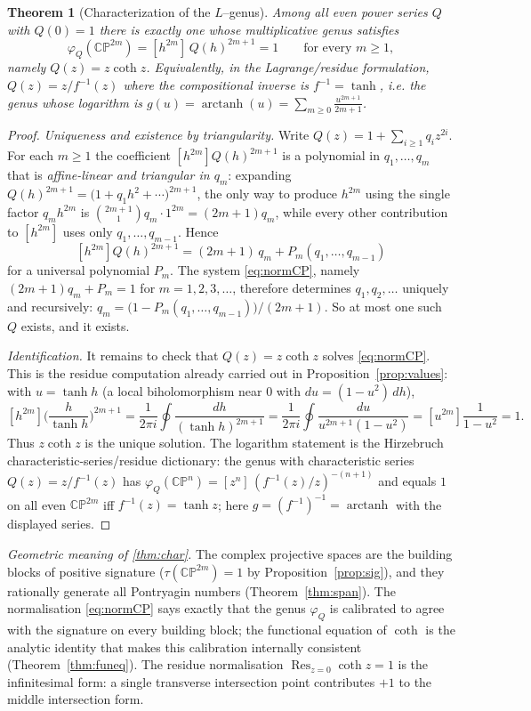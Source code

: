 \documentclass[12pt]{article}
\newtheorem{theorem}{Theorem}
\theoremstyle{definition}
\begin{document}
\begin{theorem}[Characterization of the $L$--genus]\label{thm:char}
Among all even power series $Q$ with $Q(0)=1$ there is exactly one whose multiplicative
genus satisfies
\[
\varphi_Q(\mathbb{CP}^{2m})=[h^{2m}]\,Q(h)^{2m+1}=1
\qquad\text{for every }m\ge1,
\tag{12}\label{eq:normCP}
\]
namely $Q(z)=z\coth z$. Equivalently, in the Lagrange/residue formulation, $Q(z)=z/f^{-1}(z)$
where the compositional inverse is $f^{-1}=\tanh$, i.e. the genus whose logarithm is
$g(u)=\operatorname{arctanh}(u)=\sum_{m\ge0}\frac{u^{2m+1}}{2m+1}$.
\end{theorem}

\begin{proof}
\emph{Uniqueness and existence by triangularity.} Write $Q(z)=1+\sum_{i\ge1}q_iz^{2i}$.
For each $m\ge1$ the coefficient $[h^{2m}]Q(h)^{2m+1}$ is a polynomial in $q_1,\dots,q_m$
that is \emph{affine-linear and triangular in $q_m$}: expanding
$Q(h)^{2m+1}=\big(1+q_1h^2+\cdots\big)^{2m+1}$, the only way to produce $h^{2m}$ using the
single factor $q_mh^{2m}$ is $\binom{2m+1}{1}q_m\cdot 1^{2m}=(2m+1)q_m$, while every other
contribution to $[h^{2m}]$ uses only $q_1,\dots,q_{m-1}$. Hence
\[
[h^{2m}]Q(h)^{2m+1}=(2m+1)\,q_m+P_m(q_1,\dots,q_{m-1})
\]
for a universal polynomial $P_m$. The system \eqref{eq:normCP}, namely
$(2m+1)q_m+P_m=1$ for $m=1,2,3,\dots$, therefore determines $q_1,q_2,\dots$ uniquely and
recursively: $q_m=\big(1-P_m(q_1,\dots,q_{m-1})\big)/(2m+1)$. So at most one such $Q$
exists, and it exists.

\emph{Identification.} It remains to check that $Q(z)=z\coth z$ solves \eqref{eq:normCP}.
This is the residue computation already carried out in Proposition~\ref{prop:values}:
with $u=\tanh h$ (a local biholomorphism near $0$ with $du=(1-u^2)\,dh$),
\[
[h^{2m}]\Big(\frac{h}{\tanh h}\Big)^{2m+1}
=\frac{1}{2\pi i}\oint\frac{dh}{(\tanh h)^{2m+1}}
=\frac{1}{2\pi i}\oint\frac{du}{u^{2m+1}(1-u^2)}
=[u^{2m}]\frac{1}{1-u^2}=1 .
\]
Thus $z\coth z$ is the unique solution. The logarithm statement is the Hirzebruch
characteristic-series/residue dictionary: the genus with characteristic series $Q(z)=z/f^{-1}(z)$
has $\varphi_Q(\mathbb{CP}^{n})=[z^{n}]\,(f^{-1}(z)/z)^{-(n+1)}$ and equals $1$ on all even
$\mathbb{CP}^{2m}$ iff $f^{-1}(z)=\tanh z$; here $g=(f^{-1})^{-1}=\operatorname{arctanh}$
with the displayed series.
\end{proof}

\noindent\emph{Geometric meaning of \eqref{thm:char}.} The complex projective spaces are
the building blocks of positive signature ($\tau(\mathbb{CP}^{2m})=1$ by
Proposition~\ref{prop:sig}), and they rationally generate all Pontryagin numbers
(Theorem~\ref{thm:span}). The normalisation \eqref{eq:normCP} says exactly that the genus
$\varphi_Q$ is calibrated to agree with the signature on every building block; the
functional equation of $\coth$ is the analytic identity that makes this calibration
internally consistent (Theorem~\ref{thm:funeq}). The residue normalisation
$\operatorname{Res}_{z=0}\coth z=1$ is the infinitesimal form: a single transverse
intersection point contributes $+1$ to the middle intersection form.
\end{document}
